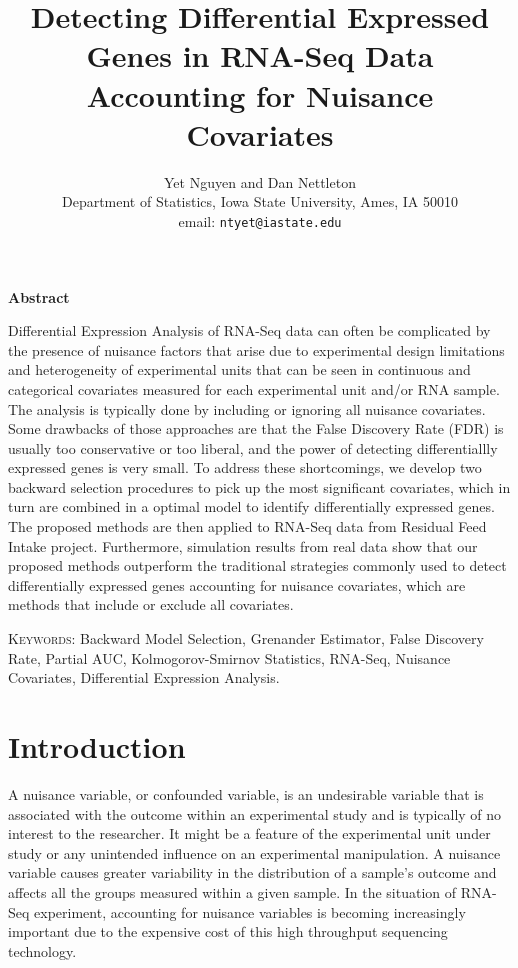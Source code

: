 \documentclass[12pt, letter]{article}\usepackage[]{graphicx}\usepackage[]{color}
\begin{document}
\title{ Detecting Differential Expressed Genes in RNA-Seq Data
Accounting for Nuisance Covariates}
\author{Yet Nguyen and Dan Nettleton\\
Department of Statistics, 
Iowa State University, Ames, IA 50010\\ 
email: \texttt{ntyet@iastate.edu}
}

\maketitle



%
\begin{center}
\textbf{Abstract}
\end{center}
Differential Expression Analysis of RNA-Seq data can often be complicated by the presence of nuisance factors that arise due to experimental design limitations and heterogeneity of experimental units that can be seen in continuous and categorical covariates measured for each experimental unit and/or RNA sample. The analysis is typically done by including or ignoring all nuisance covariates. Some drawbacks of those approaches are that the False Discovery Rate (FDR) is usually too conservative or too liberal, and the power of detecting differentiallly expressed genes is very small. To address these shortcomings, we develop two backward selection procedures to pick up the most significant covariates, which in turn are combined in a optimal model  to identify differentially expressed genes. The proposed methods are then applied to RNA-Seq data from Residual Feed Intake project. Furthermore, simulation results from real data show that our proposed methods outperform the traditional strategies commonly used to detect differentially expressed genes accounting for nuisance covariates, which are methods that include or exclude all covariates.

\vspace*{.3in}

\noindent\textsc{Keywords}: {Backward Model Selection, Grenander Estimator,  False Discovery Rate, Partial AUC, Kolmogorov-Smirnov Statistics, RNA-Seq, Nuisance Covariates, Differential Expression Analysis.}

%

\section{ Introduction}
A nuisance variable, or confounded variable, is an undesirable variable that is associated with the outcome within an experimental study and is typically of no interest to the researcher. It might be a feature of the experimental unit under study or any unintended influence on an experimental manipulation. A nuisance variable causes greater variability in the distribution of a sample's outcome and affects all the groups measured within a given sample. In the situation of RNA-Seq experiment, accounting for nuisance variables is becoming increasingly important due to the expensive cost of this high throughput sequencing technology.
\end{document}
